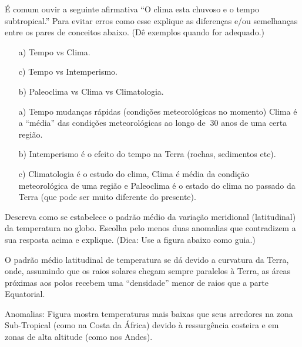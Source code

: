 \documentclass[letterpaper,portuguese,12pt,pdftex]{exam}
\begin{document}
\begin{questions}

\question[2]
É comum ouvir a seguinte afirmativa ``O clima esta chuvoso e o tempo
subtropical.''  Para evitar erros como esse explique as diferenças e/ou
semelhanças entre os pares de conceitos abaixo.  (Dê exemplos quando for
adequado.)

\begin{itemize}
  \item[a)] Tempo vs Clima.
  \item[c)] Tempo vs Intemperismo.
  \item[b)] Paleoclima vs Clima vs Climatologia.
\end{itemize}

\begin{solution}
\begin{itemize}
  \item[a)] Tempo mudanças rápidas (condições meteorológicas no momento)
            Clima é a ``média'' das condições meteorológicas ao longo de
            $~$30 anos de uma certa região.
  \item[b)] Intemperismo é o efeito do tempo na Terra (rochas, sedimentos etc).
  \item[c)] Climatologia é o estudo do clima, Clima é média da condição
            meteorológica de uma região e Paleoclima é o estado do clima no
            passado da Terra (que pode ser muito diferente do presente).
\end{itemize}
\end{solution}

\question[2\half]
Descreva como se estabelece o padrão médio da variação meridional
(latitudinal) da temperatura no globo.  Escolha pelo menos duas anomalias que
contradizem a sua resposta acima e explique. (Dica: Use a figura abaixo como
guia.)


\begin{solution}
O padrão médio latitudinal de temperatura se dá devido a curvatura da Terra,
onde, assumindo que os raios solares chegam sempre paralelos à Terra, as áreas
próximas aos polos recebem uma ``densidade'' menor de raios que a parte
Equatorial.

Anomalias: Figura mostra temperaturas mais baixas que seus arredores na zona
Sub-Tropical (como na Costa da África) devido à ressurgência costeira e em zonas
de alta altitude (como nos Andes).
\end{solution}



\end{questions}
\end{document}
